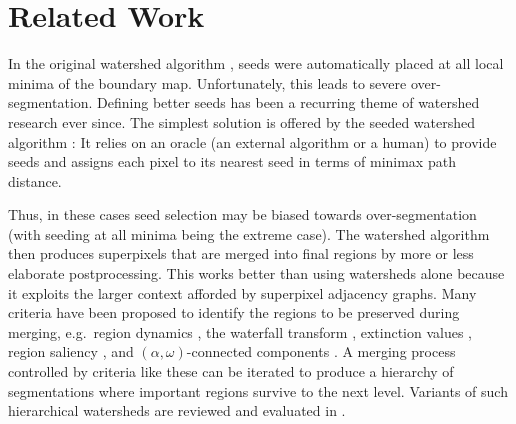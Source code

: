 
\section{Related Work} \label{2_rel_work}

\noindent In the original watershed algorithm \cite{vincent1991watersheds,Beucher-Lantu-79}, seeds were automatically placed at all local minima of the boundary map. Unfortunately, this leads to severe over-segmentation. Defining better seeds has been a recurring theme of watershed research ever since. The simplest solution is offered by the seeded watershed algorithm \cite{beucher1992morphological}: It relies on an oracle (an external algorithm or a human) to provide seeds and assigns each pixel to its nearest seed in terms of minimax path distance.


 Thus, in these cases seed selection may be biased towards over-seg\-men\-ta\-tion (with seeding at all minima being the extreme case). The watershed algorithm then produces superpixels that are merged into final regions by more or less elaborate postprocessing. This works better than using watersheds alone because it exploits the larger context afforded by superpixel adjacency graphs. Many criteria have been proposed to identify the regions to be preserved during merging, e.g.\ region dynamics \cite{grimaud_92_watershed-dynamics}, the waterfall transform \cite{beucher1994watershed}, extinction values \cite{vachier1995extinction}, region saliency \cite{najman1996geodesic}, and $(\alpha,\omega)$-connected components \cite{soille_08_hierarchical-image-decomposition}. A merging process controlled by criteria like these can be iterated to produce a hierarchy of segmentations where important regions survive to the next level. Variants of such hierarchical watersheds are reviewed and evaluated in \cite{perret_17_hierarchical-watersheds}.

